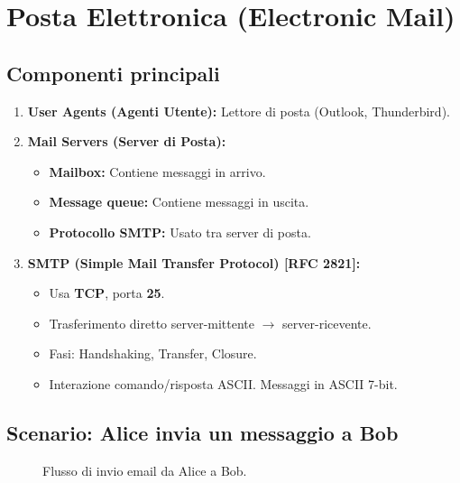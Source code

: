 \section{Posta Elettronica (Electronic Mail)}
\subsection{Componenti principali}
\begin{enumerate}
    \item \textbf{User Agents (Agenti Utente):} Lettore di posta (Outlook, Thunderbird).
    \item \textbf{Mail Servers (Server di Posta):}
    \begin{itemize}
        \item \textbf{Mailbox:} Contiene messaggi in arrivo.
        \item \textbf{Message queue:} Contiene messaggi in uscita.
        \item \textbf{Protocollo SMTP:} Usato tra server di posta.
    \end{itemize}
    \item \textbf{SMTP (Simple Mail Transfer Protocol) [RFC 2821]:}
    \begin{itemize}
        \item Usa \textbf{TCP}, porta \textbf{25}.
        \item Trasferimento diretto server-mittente $\rightarrow$ server-ricevente.
        \item Fasi: Handshaking, Transfer, Closure.
        \item Interazione comando/risposta ASCII. Messaggi in ASCII 7-bit.
    \end{itemize}
\end{enumerate}

\subsection{Scenario: Alice invia un messaggio a Bob}
\begin{figure}[H]
\centering
{}
\caption{Flusso di invio email da Alice a Bob.}
\end{figure}

